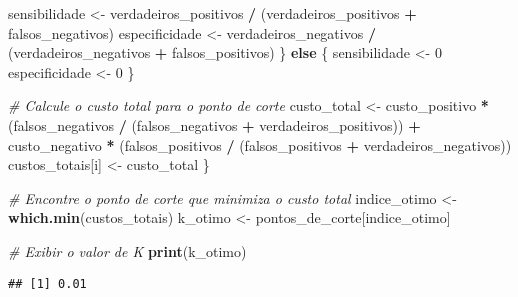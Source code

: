 \documentclass[
]{article}
\newenvironment{Shaded}{\begin{snugshade}}{\end{snugshade}}
\newcommand{\AttributeTok}[1]{\textcolor[rgb]{0.13,0.29,0.53}{#1}}
\newcommand{\CommentTok}[1]{\textcolor[rgb]{0.56,0.35,0.01}{\textit{#1}}}
\newcommand{\ControlFlowTok}[1]{\textcolor[rgb]{0.13,0.29,0.53}{\textbf{#1}}}
\newcommand{\DecValTok}[1]{\textcolor[rgb]{0.00,0.00,0.81}{#1}}
\newcommand{\FunctionTok}[1]{\textcolor[rgb]{0.13,0.29,0.53}{\textbf{#1}}}
\newcommand{\NormalTok}[1]{#1}
\newcommand{\OtherTok}[1]{\textcolor[rgb]{0.56,0.35,0.01}{#1}}
\newcommand{\SpecialCharTok}[1]{\textcolor[rgb]{0.81,0.36,0.00}{\textbf{#1}}}
\newcommand{\StringTok}[1]{\textcolor[rgb]{0.31,0.60,0.02}{#1}}
\begin{document}
\begin{Shaded}
\begin{Highlighting}[]
\NormalTok{    sensibilidade }\OtherTok{\textless{}{-}}\NormalTok{ verdadeiros\_positivos }\SpecialCharTok{/}\NormalTok{ (verdadeiros\_positivos }\SpecialCharTok{+}\NormalTok{ falsos\_negativos)}
\NormalTok{    especificidade }\OtherTok{\textless{}{-}}\NormalTok{ verdadeiros\_negativos }\SpecialCharTok{/}\NormalTok{ (verdadeiros\_negativos }\SpecialCharTok{+}\NormalTok{ falsos\_positivos)}
\NormalTok{  \} }\ControlFlowTok{else}\NormalTok{ \{}
\NormalTok{    sensibilidade }\OtherTok{\textless{}{-}} \DecValTok{0}
\NormalTok{    especificidade }\OtherTok{\textless{}{-}} \DecValTok{0}
\NormalTok{  \}}
  
  \CommentTok{\# Calcule o custo total para o ponto de corte}
\NormalTok{  custo\_total }\OtherTok{\textless{}{-}}\NormalTok{ custo\_positivo }\SpecialCharTok{*}\NormalTok{ (falsos\_negativos }\SpecialCharTok{/}\NormalTok{ (falsos\_negativos }\SpecialCharTok{+}\NormalTok{ verdadeiros\_positivos)) }\SpecialCharTok{+}
\NormalTok{                 custo\_negativo }\SpecialCharTok{*}\NormalTok{ (falsos\_positivos }\SpecialCharTok{/}\NormalTok{ (falsos\_positivos }\SpecialCharTok{+}\NormalTok{ verdadeiros\_negativos))}
\NormalTok{  custos\_totais[i] }\OtherTok{\textless{}{-}}\NormalTok{ custo\_total}
\NormalTok{\}}

\CommentTok{\# Encontre o ponto de corte que minimiza o custo total}
\NormalTok{indice\_otimo }\OtherTok{\textless{}{-}} \FunctionTok{which.min}\NormalTok{(custos\_totais)}
\NormalTok{k\_otimo }\OtherTok{\textless{}{-}}\NormalTok{ pontos\_de\_corte[indice\_otimo]}

\CommentTok{\# Exibir o valor de K}
\FunctionTok{print}\NormalTok{(k\_otimo)}
\end{Highlighting}
\end{Shaded}

\begin{verbatim}
## [1] 0.01
\end{verbatim}

\begin{Shaded}
\end{Shaded}
\end{document}

